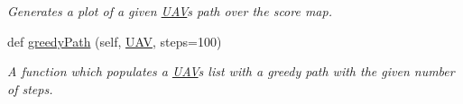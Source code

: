 \begin{DoxyCompactItemize}
\begin{DoxyCompactList}\small\item\em Generates a plot of a given \mbox{\hyperlink{classpath_plan_1_1_u_a_v}{U\+AV}}\textquotesingle{}s path over the score map. \end{DoxyCompactList}\item 
def \mbox{\hyperlink{classpath_plan_1_1_path_planner_aa578a0dcb25eed4782bb660d8b71b731}{greedy\+Path}} (self, \mbox{\hyperlink{classpath_plan_1_1_u_a_v}{U\+AV}}, steps=100)
\begin{DoxyCompactList}\small\item\em A function which populates a \mbox{\hyperlink{classpath_plan_1_1_u_a_v}{U\+AV}}\textquotesingle{}s list with a greedy path with the given number of steps. \end{DoxyCompactList}\end{DoxyCompactItemize}
